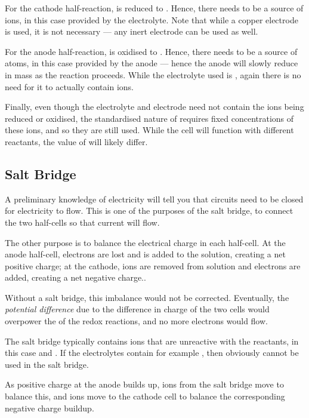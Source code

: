 			For the cathode half-reaction,  is reduced to . Hence, there needs to be a source of  ions,
			in this case provided by the  electrolyte. Note that while a copper electrode is used, it is not necessary --- any
			inert electrode can be used as well.

			For the anode half-reaction,  is oxidised to . Hence, there needs to be a source of  atoms,
			in this case provided by the anode --- hence the anode will slowly reduce in mass as the reaction proceeds. While the electrolyte
			used is , again there is no need for it to actually contain  ions.

			Finally, even though the electrolyte and electrode need not contain the ions being reduced or oxidised, the standardised nature of
			\Ecell{} requires fixed concentrations of these ions, and so they are still used. While the cell will function with different
			reactants, the value of \Ecell{} will likely differ.



		\subsection{Salt Bridge}

			A preliminary knowledge of electricity will tell you that circuits need to be closed for electricity to flow. This is one of the
			purposes of the salt bridge, to connect the two half-cells so that current will flow.

			The other purpose is to balance the electrical charge in each half-cell. At the anode half-cell, electrons are lost and
			 is added to the solution, creating a net positive charge; at the cathode,  ions are removed from solution
			and electrons are added, creating a net negative charge..

			Without a salt bridge, this imbalance would not be corrected. Eventually, the \textit{potential difference} due to the difference in
			charge of the two cells would overpower the \Ecell{} of the redox reactions, and no more electrons would flow.

			The salt bridge typically contains ions that are unreactive with the reactants, in this case  and \ch{\Cl-}. If the
			electrolytes contain for example , then obviously \ch{\Cl-} cannot be used in the salt bridge.

			As positive charge at the anode builds up, \ch{\Cl-} ions from the salt bridge move to balance this, and  ions move to the
			cathode cell to balance the corresponding negative charge buildup.


